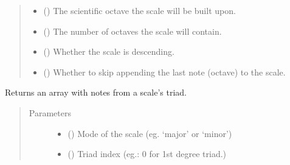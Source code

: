 \documentclass[letterpaper,10pt,english]{sphinxmanual}
\begin{document}
\begin{fulllineitems}
\begin{fulllineitems}
\begin{quote}
\begin{description}
\begin{itemize}
\item {} 
\sphinxAtStartPar
{} () \textendash{} The scientific octave the scale will be built upon.

\item {} 
\sphinxAtStartPar
{} () \textendash{} The number of octaves the scale will contain.

\item {} 
\sphinxAtStartPar
{} () \textendash{} Whether the scale is descending.

\item {} 
\sphinxAtStartPar
{} () \textendash{} Whether to skip appending the last
note (octave) to the scale.

\end{itemize}

\end{description}\end{quote}

\end{fulllineitems}


\begin{fulllineitems}
\label{\detokenize{index:birdears.scale.ChromaticScale.get_triad}}
\sphinxAtStartPar
Returns an array with notes from a scale’s triad.
\begin{quote}\begin{description}
\item[{Parameters}] \leavevmode\begin{itemize}
\item {} 
\sphinxAtStartPar
{} () \textendash{} Mode of the scale (eg. ‘major’ or ‘minor’)

\item {} 
\sphinxAtStartPar
{} () \textendash{} Triad index (eg.: 0 for 1st degree triad.)


\end{itemize}
\end{description}
\end{quote}
\end{fulllineitems}
\end{fulllineitems}
\end{document}
